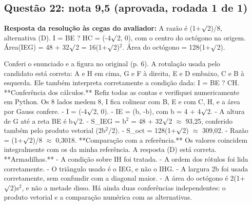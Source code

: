 \documentclass{article}%
\begin{document}
\subsection*{Questão 22: nota 9,5 (aprovada, rodada 1 de 1)}%
\textbf{Resposta da resolução às cegas do avaliador:} A razão é (1+$\surd$2)/8, alternativa (D). I = BE ? HC = (-4$\surd$2, 0), com o centro do octógono na origem. Área(IEG) = 48 + 32$\surd$2 = 16(1+$\surd$2)$^2$. Área do octógono = 128(1+$\surd$2).\par %
Conferi o enunciado e a figura no original (p. 6). A rotulação usada pelo candidato está correta: A e H em cima, G e F à direita, E e D embaixo, C e B à esquerda. Ele também interpreta corretamente a condição dada: I = BE ? CH.\newline%
\newline%
**Conferência dos cálculos.** Refiz todas as contas e verifiquei numericamente em Python. Os 8 lados medem 8, I fica colinear com B, E e com C, H, e a área por Gauss confere.\newline%
{-} I = (-4$\surd$2, 0).\newline%
{-} IE = (b, -b), com b = 4 + 4$\surd$2.\newline%
{-} A altura de G até a reta BE é b$\surd$2.\newline%
{-} S\_IEG = b$^2$ = 48 + 32$\surd$2 $\approx$ 93,25, conferido também pelo produto vetorial (2b$^2$/2).\newline%
{-} S\_oct = 128(1+$\surd$2) $\approx$ 309,02.\newline%
{-} Razão = (1+$\surd$2)/8 $\approx$ 0,3018.\newline%
\newline%
**Comparação com a referência.** Os valores coincidem integralmente com os da minha referência. A resposta (D) está correta.\newline%
\newline%
**Armadilhas.**\newline%
{-} A condição sobre IH foi tratada.\newline%
{-} A ordem dos rótulos foi lida corretamente.\newline%
{-} O triângulo usado é o IEG, e não o IHG.\newline%
{-} A largura 2b foi usada corretamente, sem confundir com a diagonal maior.\newline%
{-} A área do octógono é 2(1+$\surd$2)s$^2$, e não a metade disso.\newline%
\newline%
Há ainda duas conferências independentes: o produto vetorial e a comparação numérica com as alternativas.\newline%
\end{document}

